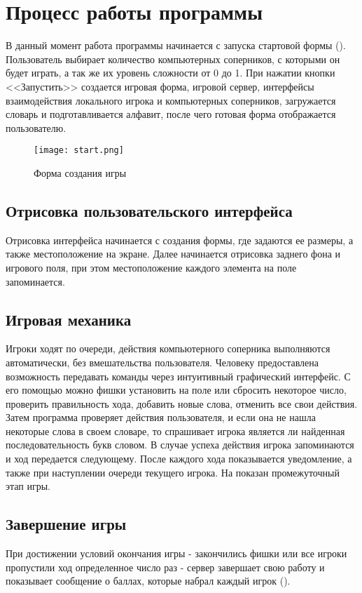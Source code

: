 \documentclass[a4paper,14pt]{article}
\begin{document}
\section{Процесс работы программы}
	В данный момент работа программы начинается с запуска стартовой формы ().
	Пользователь выбирает количество компьютерных соперников, с которыми он будет играть, а так же их уровень сложности от 0 до 1.
	При нажатии кнопки <<Запустить>> создается игровая форма, игровой сервер, интерфейсы взаимодействия локального игрока и компьютерных соперников, загружается словарь и подготавливается алфавит, после чего готовая форма отображается пользователю.

	\begin{figure}[H]
		\centering
		\texttt{[image: start.png]}
		\caption{Форма создания игры}
		\label{img:start}
	\end{figure}

	\subsection[Отрисовка интерфейса]{Отрисовка пользовательского интерфейса}
	Отрисовка интерфейса начинается с создания формы, где задаются ее размеры, а также местоположение на экране.
	Далее начинается отрисовка заднего фона и игрового поля, при этом местоположение каждого элемента на поле запоминается.
		
	\subsection{Игровая механика}
	Игроки ходят по очереди, действия компьютерного соперника выполняются автоматически, без вмешательства пользователя.
	Человеку предоставлена возможность передавать команды через интуитивный графический интерфейс.
	С его помощью можно фишки установить на поле или сбросить некоторое число, проверить правильность хода, добавить новые слова, отменить все свои действия.
	Затем программа проверяет действия пользователя, и если она не нашла некоторые слова в своем словаре, то спрашивает игрока является ли найденная последовательность букв словом.
	В случае успеха действия игрока запоминаются и ход передается следующему.
	После каждого хода показывается уведомление, а также при наступлении очереди текущего игрока. На  показан промежуточный этап игры.
	
	\subsection{Завершение игры}
	При достижении условий окончания игры - закончились фишки или все игроки пропустили ход определенное число раз - сервер завершает свою работу и показывает сообщение о баллах, которые набрал каждый игрок ().
	
\end{document}
